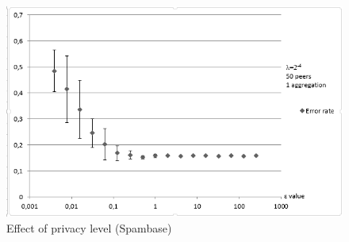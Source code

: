 \begin{figure}[H]
	\centering
	\includegraphics[width=\textwidth]{fig/spambase/epsilon_big_range}
	\caption{Effect of privacy level (Spambase)}
	\label{fig:epsilon_big_range}
\end{figure}

